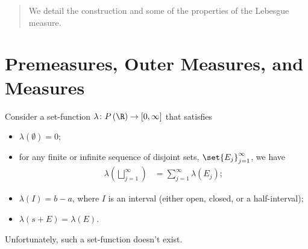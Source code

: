 \documentclass[10pt]{mypackage}
\begin{document}
\RaggedRight
\begin{abstract}
  \noindent We detail the construction and some of the properties of the Lebesgue measure.
\end{abstract}
\section{Premeasures, Outer Measures, and Measures}%
Consider a set-function $\lambda\colon P\left( \R \right)\rightarrow [0,\infty]$ that satisfies
\begin{itemize}
  \item $\lambda\left( \emptyset \right) = 0$;
  \item for any finite or infinite sequence of disjoint sets, $\set{E_j}_{j=1}^{\infty}$, we have
    \begin{align*}
      \lambda\left( \bigsqcup_{j=1}^{\infty} \right) &= \sum_{j=1}^{\infty}\lambda\left( E_j \right);
    \end{align*}
  \item $\lambda\left( I \right) = b - a$, where $I$ is an interval (either open, closed, or a half-interval);
  \item $\lambda\left( s + E \right) = \lambda\left( E \right)$.
\end{itemize}
Unfortunately, such a set-function doesn't exist.\newline
\end{document}
